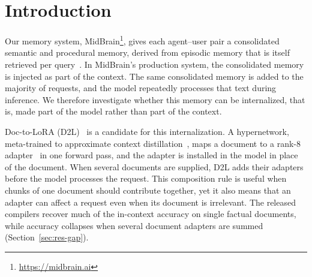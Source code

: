 \documentclass{article}
\begin{document}
\section{Introduction}
\label{sec:intro}

Our memory system, MidBrain\footnote{\url{https://midbrain.ai}}, gives each
agent--user pair a consolidated semantic and procedural memory, derived from episodic
memory that is itself retrieved per query~\citep{tulving1972episodic,derehag2026smartsearch}.
In MidBrain's production system, the consolidated memory is injected as part of the
context. The same consolidated memory is added to the majority of requests, and the
model repeatedly processes that text during inference. We therefore
investigate whether this memory can be internalized, that is, made part of the model
rather than part of the context.

Doc-to-LoRA (D2L)~\citep{charakorn2026doctolora} is a candidate for this
internalization. A hypernetwork, meta-trained to approximate context
distillation~\citep{snell2022learning}, maps a document to a rank-8
adapter~\citep{hu2022lora} in one forward pass, and the adapter is installed in the
model in place of the document. When several documents are supplied, D2L adds their
adapters before the model processes the request. This composition rule is useful when
chunks of one document should contribute together, yet it also means that an adapter
can affect a request even when its document is irrelevant. The released compilers
recover much of the in-context accuracy on single factual
documents, while accuracy collapses when several
document adapters are summed (Section~\ref{sec:res-gap}).
\end{document}
